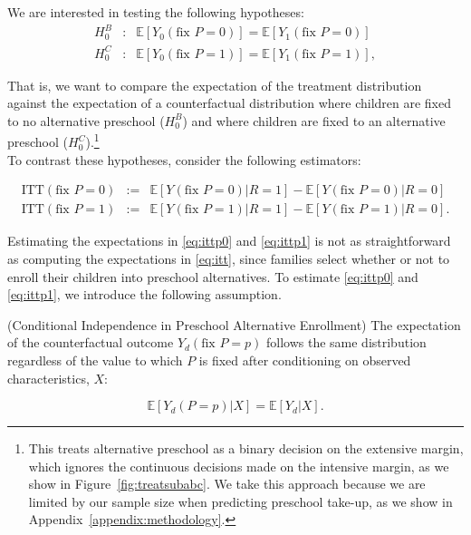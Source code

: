 \noindent We are interested in testing the following hypotheses:
\begin{eqnarray}
H_{0}^B &:& \mathbb{E} \left[ Y_{0} \left( \text{fix } P = 0 \right) \right] =  \mathbb{E} \left[ Y_{1} \left( \text{fix } P = 0 \right) \right] \label{eq:hoB} \\
H_{0}^C &:&  \mathbb{E} \left[ Y_{0} \left( \text{fix } P = 1 \right) \right] =  \mathbb{E} \left[ Y_{1} \left( \text{fix } P = 1 \right)  \right] \label{eq:hoC},
\end{eqnarray}

\noindent That is, we want to compare the expectation of the treatment distribution against the expectation of a counterfactual distribution where children are fixed to no alternative preschool ($H_{0}^B$) and where children are fixed to an alternative preschool ($H_{0}^C$).\footnote{This treats alternative preschool as a binary decision on the extensive margin, which ignores the continuous decisions made on the intensive margin, as we show in Figure~\ref{fig:treatsubabc}. We take this approach because we are limited by our sample size when predicting preschool take-up, as we show in Appendix~\ref{appendix:methodology}.}\\

\noindent To contrast these hypotheses, consider the following estimators: 

\begin{eqnarray}
\text{ITT} \left( \text{fix } P = 0 \right) &:=& \mathbb{E} \left[ Y \left( \text{fix } P = 0 \right)  | R = 1 \right] - \mathbb{E} \left[ Y \left( \text{fix } P = 0 \right) | R = 0 \right] \label{eq:ittp0} \\
\text{ITT} \left( \text{fix } P = 1 \right) &:=& \mathbb{E} \left[ Y \left( \text{fix } P = 1 \right) | R = 1 \right] - \mathbb{E} \left[ Y \left( \text{fix } P = 1 \right) | R = 0 \right]. \label{eq:ittp1}  
\end{eqnarray}

\noindent Estimating the expectations in \eqref{eq:ittp0} and \eqref{eq:ittp1} is not as straightforward as computing the expectations in \eqref{eq:itt}, since families select whether or not to enroll their children into preschool alternatives. To estimate \eqref{eq:ittp0} and \eqref{eq:ittp1}, we introduce the following assumption. \\

\begin{assumption} \normalfont \label{assumption:matching} (Conditional Independence in Preschool Alternative Enrollment) The expectation of the counterfactual outcome $Y_{d} \left( \text{fix } P=p \right)$ follows the same distribution regardless of the value to which $P$ is fixed after conditioning on observed characteristics, $X$:

\begin{equation}
\mathbb{E} \left [ Y_{d} \left( P = p \right) | X  \right] = \mathbb{E} \left [ Y_{d} | X  \right].
\end{equation}
 \end{assumption}


